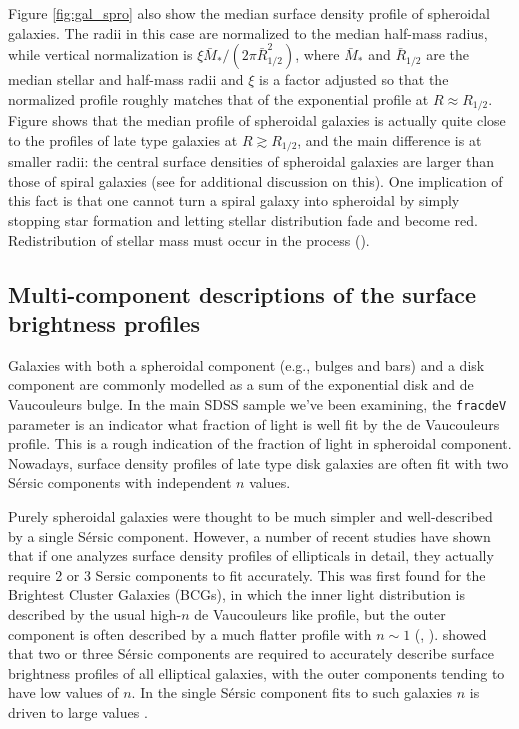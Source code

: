 Figure \ref{fig:gal_spro} also show the median surface density profile of spheroidal galaxies. The radii in this case are normalized to the median half-mass radius, while vertical normalization is $\xi \bar{M}_*/(2\pi \bar{R}_{1/2}^2)$, where $\bar{M}_*$ and $\bar{R}_{1/2}$ are the median stellar and half-mass radii and $\xi$ is a factor adjusted so that the normalized profile roughly matches that of the exponential profile at $R\approx R_{1/2}$. Figure shows that the median profile of spheroidal galaxies is actually quite close to the profiles of late type galaxies at $R\gtrsim R_{1/2}$, and the main difference is at smaller radii: the central surface densities of spheroidal galaxies are larger than those of spiral galaxies (see \href{http://adsabs.harvard.edu/abs/2013ApJ...764L..31K}{\citealt{kravtsov13}} for additional discussion on this). One implication of this fact is that one cannot turn a spiral galaxy into spheroidal by simply stopping star formation and letting stellar distribution fade and become red. Redistribution of stellar mass must occur in the process (\href{http://adsabs.harvard.edu/abs/2013ApJ...776...63F}{\citealt{fang_etal13}}).

\subsection{Multi-component descriptions of the surface brightness profiles}
\label{sec:spro_multicomp}

Galaxies with both a spheroidal component (e.g., bulges and bars) and a disk component are commonly modelled as a sum of the exponential disk and de Vaucouleurs bulge. 
In the main SDSS sample we've been examining, the {\tt fracdeV} parameter is an indicator what fraction of light is well fit by the de Vaucouleurs profile. This is a rough indication of the fraction of light in spheroidal component.  Nowadays, surface density profiles of late type disk galaxies are often fit with  two S\'ersic components with independent $n$ values. 

Purely spheroidal galaxies were thought to be much simpler and well-described by a single S\'ersic component. However,  a number of recent studies have shown that if one analyzes surface density profiles of ellipticals in detail, they actually require 2 or 3 Sersic components to fit accurately. This was first found for the Brightest Cluster Galaxies (BCGs), in which the inner light distribution is described by the usual high-$n$ de Vaucouleurs like profile, but the outer component is often described by a much flatter profile with $n\sim 1$ (\href{http://adsabs.harvard.edu/abs/2007MNRAS.378.1575S}{\citealt{seigar_etal07}}, \href{http://adsabs.harvard.edu/abs/2014arXiv1401.7329K}{\citealt{kravtsov_etal14}}). \href{http://adsabs.harvard.edu/abs/2013ApJ...766...47H}{\citet{huang_etal13a}} showed that two or three S\'ersic components are required to accurately describe surface brightness profiles of all elliptical galaxies, with the outer components tending to have low values of $n$. 
In the single S\'ersic component fits to such galaxies $n$ is driven to large values \href{http://adsabs.harvard.edu/abs/1996ApJ...465..534G}{\citep{graham_etal96}}.

